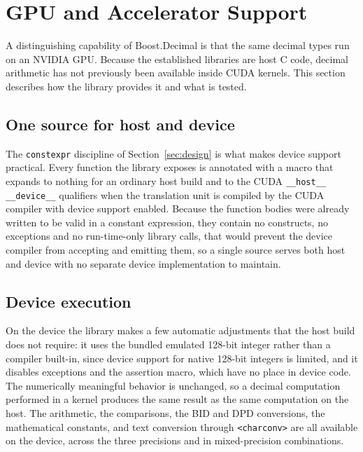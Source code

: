 \documentclass[acmsmall]{acmart}
\begin{document}
\section{GPU and Accelerator Support}
\label{sec:gpu}

A distinguishing capability of Boost.Decimal is that the same decimal types run on an
NVIDIA GPU. Because the established libraries are host C code, decimal arithmetic has not
previously been available inside CUDA kernels. This section describes how the library
provides it and what is tested.

\subsection{One source for host and device}
The \texttt{constexpr} discipline of Section~\ref{sec:design} is what makes device
support practical. Every function the library exposes is annotated with a macro that
expands to nothing for an ordinary host build and to the CUDA
\texttt{\_\_host\_\_ \_\_device\_\_} qualifiers when the translation unit is compiled by
the CUDA compiler with device support enabled. Because the function bodies were already
written to be valid in a constant expression, they contain no constructs, no exceptions
and no run-time-only library calls, that would prevent the device compiler from accepting
and emitting them, so a single source serves both host and device with no separate device
implementation to maintain.

\subsection{Device execution}
On the device the library makes a few automatic adjustments that the host build does not
require: it uses the bundled emulated 128-bit integer rather than a compiler built-in,
since device support for native 128-bit integers is limited, and it disables exceptions
and the assertion macro, which have no place in device code. The numerically meaningful
behavior is unchanged, so a decimal computation performed in a kernel produces the same
result as the same computation on the host. The arithmetic, the comparisons, the BID and
DPD conversions, the mathematical constants, and text conversion through
\texttt{<charconv>} are all available on the device, across the three precisions and in
mixed-precision combinations.
\end{document}
